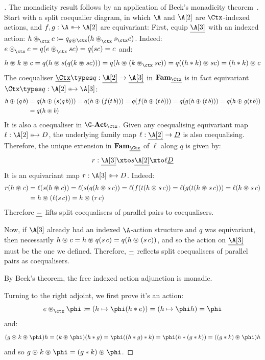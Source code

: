 \begin{proof}[]
  The monadicity result follows by an application of Beck's
  monadicity theorem~\cite[Thm.~VI.7.1]{mac-lane:cwm}.
  Start with a split coequalier diagram, in which $\A$ and
  $\B$ are $\Ctx$-indexed actions, and $f,g : \A \equito \B$ are
  equivariant:
  First, equip $\carrier\C$ with an indexed action:
  \(
  h \iact\ctx c \definedby q_{g\act\ctx}(h\iact\ctx s_{\ctx} c)
  \).
  Indeed:
  \(
  \unit\iact\ctx c = q(\unit\iact\ctx s c)
  =
  q(s c) = c
  \)
  and:
  \[
  h \act k \act c = q(h\act s (q(k\act s c)))
  =q(h\act (k\iact\ctx s c))
  =q((h\mul k)\act s c)
  = (h\mul k)\act c
  \]
  The coequaliser $\carrier\Ctx \types q : \carrier\B \to \carrier\C$ in $\Fam_{\carrier\Ctx}$
  is in fact equivariant $\Ctx \types q: \B \equito \C$:
  \begin{align*}
  h\act(q\,b) &= q(h\act(s(q\,b)))= q(h\act(f(t\,b)))
  = q(f(h\act(t\,b)))
  = q(g(h\act (t\,b)))
  = q(h\act g(t\,b))
  \\&= q(h\act b)
  \end{align*}
  It is also a coequaliser in $\Action\G_{\Ctx}$. Given any
  coequalising equivariant map $\ell : \B \equito D$,
  the underlying family map $\ell : \carrier\B \to \carrier D$ is also
  coequalising. Therefore, the unique extension in $\Fam_{\carrier\Ctx}$ of $\ell$
  along $q$ is given by:
  \[
  r : \carrier \C \xto s \carrier\B \xto \ell \carrier D
  \]
  It is an equivariant map $r : \C \equito D$. Indeed:
  \begin{align*}
  r(h \act c) &= \ell(s(h \act c)) = \ell(s(q(h \act s\,c)) =
  \ell(f(t(h \act s\,c)) = \ell(g(t(h\act s\, c)))
  = \ell(h\act s\,c)
  \\&= h \act (\ell(s\,c)) = h \act (r\,c)
  \end{align*}
  Therefore $\underline{-}$ lifts split coequalisers of parallel pairs to
  coequalisers.

  Now, if $\C$ already had an indexed $\A$-action structure and $q$
  was equivariant, then necessarily $h \act c = h\act q(s\,c) =
  q(h\act (s\,c))$, and so the action on $\carrier\C$ must be the one
  we defined. Therefore, $\underline{-}$ reflects split coequalisers of
  parallel pairs as coequalisers.

  By Beck's theorem, the free indexed action adjunction is monadic.

  Turning to the right adjoint, we first prove it's an action:
  \[
  \unit\iact{\ctx}\phi
  \definedby
  \parent{\fun{h}\phi(h\mul\unit)}
  =
  \parent{\fun{h}\phi h} = \phi
  \] and:
  \begin{align*}
    (g \act k \act \phi)h =
    (k \act \phi)(h \mul g) =
    \phi((h\mul g) \mul k)
    =
    \phi(h\mul (g \mul k))
    =
    ((g\mul k)\act \phi)h
  \end{align*}
  and so \(
  g \act k \act \phi = (g\mul k)\act \phi
  \).


\end{proof}
